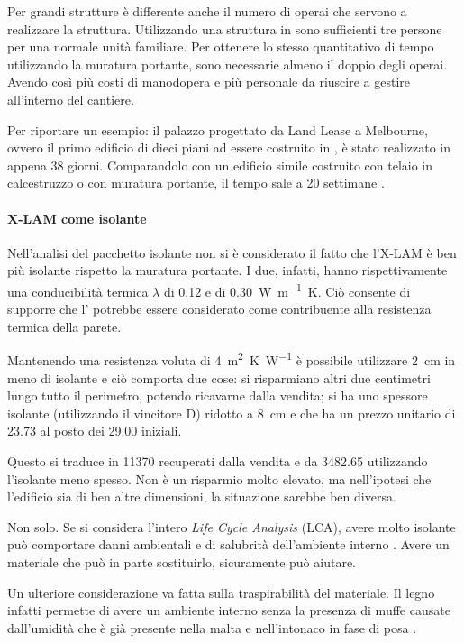 Per grandi strutture è differente anche il numero di operai che servono a realizzare la struttura. Utilizzando una struttura in \xlam{} sono sufficienti tre persone per una normale unità familiare. Per ottenere lo stesso quantitativo di tempo utilizzando la muratura portante, sono necessarie almeno il doppio degli operai. Avendo così più costi di manodopera e più personale da riuscire a gestire all'interno del cantiere. 

Per riportare un esempio: il palazzo progettato da Land Lease a Melbourne, ovvero il primo edificio di dieci piani ad essere costruito in \xlam, è stato realizzato in appena 38 giorni. Comparandolo con un edificio simile costruito con telaio in calcestruzzo o con muratura portante, il tempo sale a 20 settimane \cite[39]{10storey}. 


\paragraph{X-LAM come isolante}
Nell'analisi del pacchetto isolante non si è considerato il fatto che l'X-LAM è ben più isolante rispetto la muratura portante. I due, infatti, hanno rispettivamente una conducibilità termica $\lambda$ di \SI{0.12}{} e di \SI{0.30}{W\per\metre K}.
Ciò consente di supporre che l'\xlam{} potrebbe essere considerato come contribuente alla resistenza termica della parete. 

Mantenendo una resistenza voluta di \SI{4}{\square\metre K\per W} è possibile utilizzare \SI{2}{\centi\metre} in meno di isolante e ciò comporta due cose: si risparmiano altri due centimetri lungo tutto il perimetro, potendo ricavarne dalla vendita; si ha uno spessore isolante (utilizzando il vincitore D) ridotto a \SI{8}{\centi\metre} e che ha un prezzo unitario di \SI{23.73}{\teuro} al posto dei \SI{29.00}{\teuro} iniziali.

Questo si traduce in \SI{11370}{\teuro} recuperati dalla vendita e da \SI{3482.65}{\teuro} utilizzando l'isolante meno spesso. 
Non è un risparmio molto elevato, ma nell'ipotesi che l'edificio sia di ben altre dimensioni, la situazione sarebbe ben diversa. 

Non solo. 
Se si considera l'intero \textit{Life Cycle Analysis} (LCA), avere molto isolante può comportare danni ambientali e di salubrità dell'ambiente interno \cite{reijnders_comprehensiveness_1999}. 
Avere un materiale che può in parte sostituirlo, sicuramente può aiutare. 

Un ulteriore considerazione va fatta sulla traspirabilità del materiale. 
Il legno infatti permette di avere un ambiente interno senza la presenza di muffe causate dall'umidità che è già presente nella malta e nell'intonaco in fase di posa \cite{sutton_introduction_nodate}.
